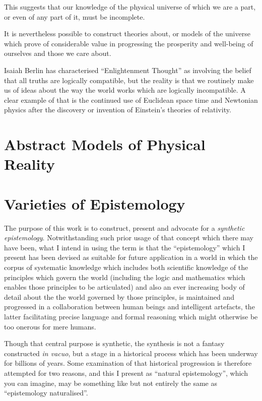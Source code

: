 \documentclass[10pt,titlepage]{book}
\begin{document}
This suggests that our knowledge of the physical universe of which we are a part, or even of any part of it, must be incomplete.

It is nevertheless possible to construct theories about, or models of the universe which prove of considerable value in progressing the prosperity and well-being of ourselves and those we care about.

Isaiah Berlin has characterised ``Enlightenment Thought'' as involving the belief that all truths are logically compatible, but the reality is that we routinely make us of ideas about the way the world works which are logically incompatible.
A clear example of that is the continued use of Euclidean space time and Newtonian physics after the discovery or invention of Einstein's theories of relativity.

\chapter{Abstract Models of Physical Reality}

\appendix

\chapter{Varieties of Epistemology}


The purpose of this work is to construct, present and advocate for a \emph{synthetic epistemology}.
Notwithstanding such prior usage of that concept which there may have been, what I intend in using the term is that the ``epistemology'' which I present has been devised as suitable for future application in a world in which the corpus of systematic knowledge which includes both scientific knowledge of the principles which govern the world (including the logic and mathematics which enables those principles to be articulated) and also an ever increasing body of detail about the the world governed by those principles, is maintained and progressed in a collaboration between human beings and intelligent artefacts, the latter facilitating precise language and formal reasoning which might otherwise be too onerous for mere humans.

Though that central purpose is synthetic, the synthesis is not a fantasy constructed \emph{in vacuo}, but a stage in a historical process which has been underway for billions of years.
Some examination of that historical progression is therefore attempted for two reasons, and this I present as ``natural epistemology'', which you can imagine, may be something like but not entirely the same as ``epistemology naturalised''.
\end{document}
